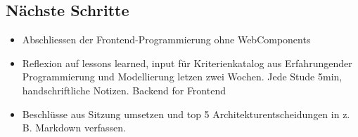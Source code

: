 \documentclass{article}
\begin{document}
\subsection{Nächste Schritte}
\begin{itemize}
    \item Abschliessen der Frontend-Programmierung ohne WebComponents
    \item Reflexion auf lessons learned, input für Kriterienkatalog aus Erfahrungender Programmierung und Modellierung letzen zwei Wochen. Jede Stude 5min, handschriftliche Notizen. Backend for Frontend
    \item Beschlüsse aus Sitzung umsetzen und top 5 Architekturentscheidungen in z. B. Markdown verfassen.
\end{itemize}
\end{document}
